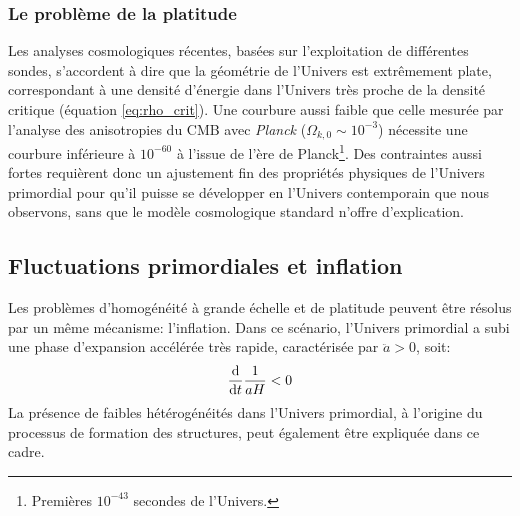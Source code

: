 \subsubsection{Le problème de la platitude} %
Les analyses cosmologiques récentes, basées sur l'exploitation de différentes sondes, s'accordent à dire que la géométrie de l'Univers est extrêmement plate, correspondant à une densité d'énergie dans l'Univers très proche de la densité critique (équation \ref{eq:rho_crit}).
Une courbure aussi faible que celle mesurée par l'analyse des anisotropies du CMB avec \textit{Planck} ($\Omega_{k,0} \sim 10^{-3}$) nécessite une courbure inférieure à $10^{-60}$ à l'issue de l'ère de Planck\footnote{Premières $10^{-43}$ secondes de l'Univers.}.
Des contraintes aussi fortes requièrent donc un ajustement fin des propriétés physiques de l'Univers primordial pour qu'il puisse se développer en l'Univers contemporain que nous observons, sans que le modèle cosmologique standard n'offre d'explication.

\subsection{Fluctuations primordiales et inflation}

Les problèmes d'homogénéité à grande échelle et de platitude peuvent être résolus par un même mécanisme: l'inflation.
Dans ce scénario, l'Univers primordial a subi une phase d'expansion accélérée très rapide, caractérisée par $\ddot{a} > 0$, soit:
\begin{equation}
    \frac{\mathrm{d}}{\mathrm{d} t} \frac{1}{aH} < 0
\end{equation}
La présence de faibles hétérogénéités dans l'Univers primordial, à l'origine du processus de formation des structures, peut également être expliquée dans ce cadre.

